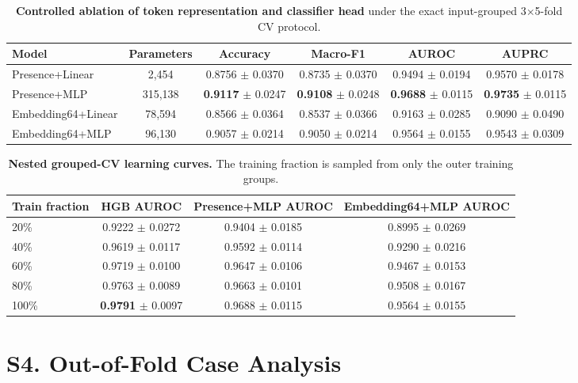\documentclass[11pt,a4paper]{article}
\begin{document}
\begin{table}[ht]
\centering
\caption{\textbf{Controlled ablation of token representation and classifier head}
under the exact input-grouped 3$\times$5-fold CV protocol.}
\label{tab:sup3}
\begin{tabular}{lccccc}
\toprule
\textbf{Model} & \textbf{Parameters} & \textbf{Accuracy} & \textbf{Macro-F1} & \textbf{AUROC} & \textbf{AUPRC} \\
\midrule
Presence+Linear & 2,454 & 0.8756 $\pm$ 0.0370 & 0.8735 $\pm$ 0.0370 & 0.9494 $\pm$ 0.0194 & 0.9570 $\pm$ 0.0178 \\
Presence+MLP & 315,138 & \textbf{0.9117} $\pm$ 0.0247 & \textbf{0.9108} $\pm$ 0.0248 & \textbf{0.9688} $\pm$ 0.0115 & \textbf{0.9735} $\pm$ 0.0115 \\
Embedding64+Linear & 78,594 & 0.8566 $\pm$ 0.0364 & 0.8537 $\pm$ 0.0366 & 0.9163 $\pm$ 0.0285 & 0.9090 $\pm$ 0.0490 \\
Embedding64+MLP & 96,130 & 0.9057 $\pm$ 0.0214 & 0.9050 $\pm$ 0.0214 & 0.9564 $\pm$ 0.0155 & 0.9543 $\pm$ 0.0309 \\
\bottomrule
\end{tabular}
\end{table}

\begin{table}[ht]
\centering
\caption{\textbf{Nested grouped-CV learning curves.}
The training fraction is sampled from only the outer training groups.}
\label{tab:sup4}
\begin{tabular}{lccc}
\toprule
\textbf{Train fraction} & \textbf{HGB AUROC} & \textbf{Presence+MLP AUROC} & \textbf{Embedding64+MLP AUROC} \\
\midrule
20\% & 0.9222 $\pm$ 0.0272 & 0.9404 $\pm$ 0.0185 & 0.8995 $\pm$ 0.0269 \\
40\% & 0.9619 $\pm$ 0.0117 & 0.9592 $\pm$ 0.0114 & 0.9290 $\pm$ 0.0216 \\
60\% & 0.9719 $\pm$ 0.0100 & 0.9647 $\pm$ 0.0106 & 0.9467 $\pm$ 0.0153 \\
80\% & 0.9763 $\pm$ 0.0089 & 0.9663 $\pm$ 0.0101 & 0.9508 $\pm$ 0.0167 \\
100\% & \textbf{0.9791} $\pm$ 0.0097 & 0.9688 $\pm$ 0.0115 & 0.9564 $\pm$ 0.0155 \\
\bottomrule
\end{tabular}
\end{table}

\section*{S4. Out-of-Fold Case Analysis}
\end{document}
